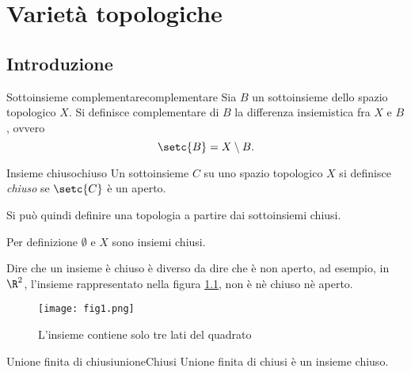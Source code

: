%
%
\chapter{Varietà topologiche}
\section{Introduzione}

\begin{defn}{Sottoinsieme complementare}{complementare}
	Sia \(B\) un sottoinsieme dello spazio topologico \(X\).
	Si definisce complementare di \(B\) la differenza insiemistica fra \(X\) e \(B\), ovvero
	\[
		\setc{B}=X\setminus B.
	\]
\end{defn}

\begin{defn}{Insieme chiuso}{chiuso}
	Un sottoinsieme \(C\) su uno spazio topologico \(X\) si definisce \emph{chiuso} se \(\setc{C}\) è un aperto.
\end{defn}

\begin{oss}
	Si può quindi definire una topologia a partire dai sottoinsiemi chiusi.
\end{oss}

\begin{oss}
	Per definizione \(\emptyset\) e \(X\) sono insiemi chiusi.
\end{oss}

\begin{oss}
	Dire che un insieme è chiuso è diverso da dire che è non aperto, ad esempio, in \(\R^2\), l'insieme rappresentato nella figura \ref{fig:fig1}, non è nè chiuso nè aperto.
\end{oss}

\begin{figure}[tp]
	\begin{centering}
		\texttt{[image: fig1.png]}
		\caption{L'insieme contiene solo tre lati del quadrato}
		\label{fig:fig1}
	\end{centering}
\end{figure}

\begin{prop}{Unione finita di chiusi}{unioneChiusi}
	Unione finita di chiusi è un insieme chiuso.
\end{prop}

